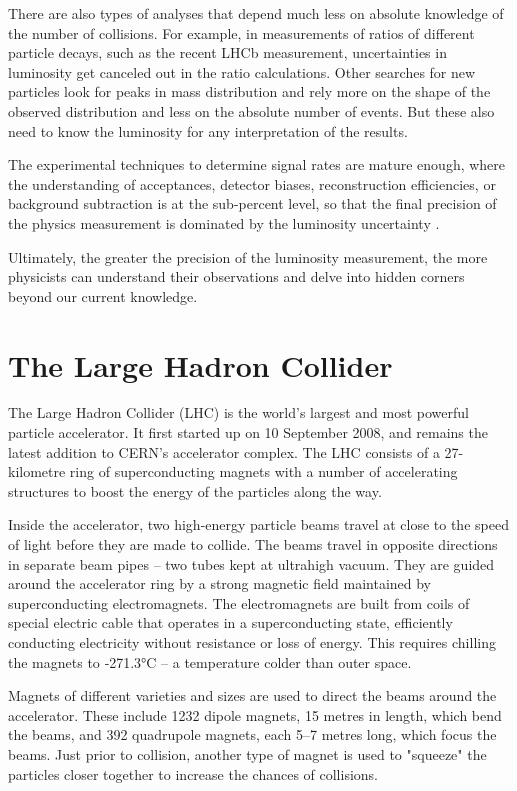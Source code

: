 There are also types of analyses that depend much less on absolute knowledge of the number of collisions. For example, in measurements of ratios of different particle decays, such as the recent LHCb measurement, uncertainties in luminosity get canceled out in the ratio calculations. Other searches for new particles look for peaks in mass distribution and rely more on the shape of the observed distribution and less on the absolute number of events. But these also need to know the luminosity for any interpretation of the results.

The experimental techniques to determine signal rates are mature enough, where the understanding of acceptances, detector biases, reconstruction efficiencies, or background subtraction is at the sub-percent level, so that the final precision of the physics measurement is dominated by the luminosity uncertainty \cite{lumi_paper_def_and_concept}.

Ultimately, the greater the precision of the luminosity measurement, the more physicists can understand their observations and delve into hidden corners beyond our current knowledge.

\section{The Large Hadron Collider}

The Large Hadron Collider (LHC) is the world’s largest and most powerful particle accelerator. It first started up on 10 September 2008, and remains the latest addition to CERN’s accelerator complex. The LHC consists of a 27-kilometre ring of superconducting magnets with a number of accelerating structures to boost the energy of the particles along the way.

Inside the accelerator, two high-energy particle beams travel at close to the speed of light before they are made to collide. The beams travel in opposite directions in separate beam pipes – two tubes kept at ultrahigh vacuum. They are guided around the accelerator ring by a strong magnetic field maintained by superconducting electromagnets. The electromagnets are built from coils of special electric cable that operates in a superconducting state, efficiently conducting electricity without resistance or loss of energy. This requires chilling the magnets to ‑271.3°C – a temperature colder than outer space. 

Magnets of different varieties and sizes are used to direct the beams around the accelerator. These include 1232 dipole magnets, 15 metres in length, which bend the beams, and 392 quadrupole magnets, each 5–7 metres long, which focus the beams. Just prior to collision, another type of magnet is used to "squeeze" the particles closer together to increase the chances of collisions. 

